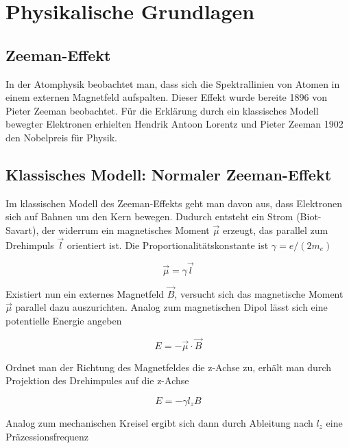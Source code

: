 \documentclass[a4paper,german,12pt,smallheadings]{scrartcl}
\begin{document}
\begin{titlepage}

\end{titlepage}

\allowdisplaybreaks %

\section{Physikalische Grundlagen}
\subsection{Zeeman-Effekt}

In der Atomphysik beobachtet man, dass sich die Spektrallinien von Atomen in
einem externen Magnetfeld aufspalten. Dieser Effekt wurde bereite 1896 von
Pieter Zeeman beobachtet. Für die Erklärung durch ein klassisches Modell
bewegter Elektronen erhielten Hendrik Antoon Lorentz und Pieter Zeeman 1902 den
Nobelpreis für Physik.

\subsection{Klassisches Modell: Normaler Zeeman-Effekt}
Im klassischen Modell des Zeeman-Effekts geht man davon aus, dass Elektronen
sich auf Bahnen um den Kern bewegen. Dudurch entsteht ein Strom (Biot-Savart),
der widerrum ein magnetisches Moment $\vec{\mu}$ erzeugt, das parallel zum
Drehimpuls $\vec{l}$ orientiert ist. Die Proportionalitätskonstante ist $\gamma
= e/(2m_e)$

\begin{equation}
  \vec{\mu} = \gamma \vec{l}
\end{equation}

Existiert nun ein externes Magnetfeld $\vec{B}$, versucht sich das magnetische
Moment $\vec{\mu}$ parallel dazu auszurichten. Analog zum magnetischen Dipol
lässt sich eine potentielle Energie angeben

\begin{equation}
  E = - \vec{\mu} \cdot \vec{B}
\end{equation}

Ordnet man der Richtung des Magnetfeldes die z-Achse zu, erhält man durch
Projektion des Drehimpules auf die z-Achse

\begin{equation}
  E = - \gamma l_z B
\end{equation}

Analog zum mechanischen Kreisel ergibt sich dann durch Ableitung nach $l_z$
eine Präzessionsfrequenz
\end{document}
